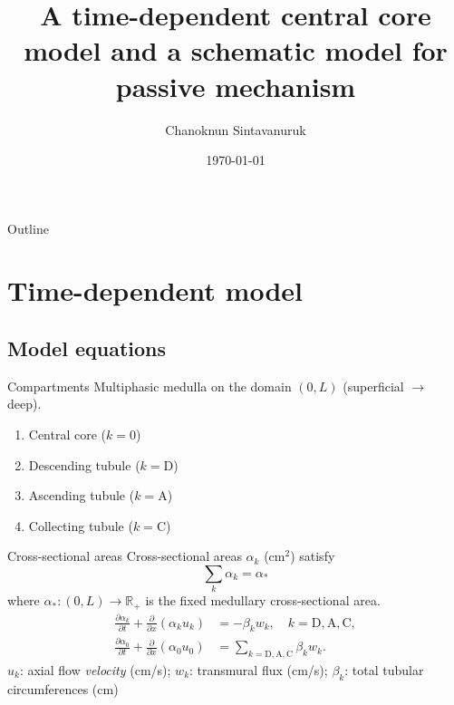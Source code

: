 \documentclass{beamer}
\title[]{A time-dependent central core model and a schematic model for passive mechanism}
\author[C. Sint]{Chanoknun Sintavanuruk 
}
\date{\today}
\begin{document}
\begin{frame}
    \titlepage 
\end{frame}

\begin{frame}{Outline}
    \tableofcontents
\end{frame}

\section{Time-dependent model}

\subsection{Model equations}

\begin{frame}{Compartments}
    Multiphasic medulla on the domain $(0,L)$ (superficial $\to$ deep).
    \begin{enumerate}
        \item Central core ($k=0$)
        \item Descending tubule ($k=\mathrm{D}$)
        \item Ascending tubule ($k=\mathrm{A}$)
        \item Collecting tubule ($k=\mathrm{C}$)
    \end{enumerate}
\end{frame}

\begin{frame}{Cross-sectional areas}
    Cross-sectional areas $\alpha_k$ ($\text{cm}^2$) satisfy
    \begin{equation}\label{eq:vol_conserv}
        \sum_k \alpha_k = \alpha_*
    \end{equation}
        where $\alpha_*:(0,L)\to \mathbb{R}_+$ is the fixed medullary cross-sectional area.
    \pause
    \begin{align}\label{eq:volume_dynamics}
        \frac{\partial \alpha_k}{\partial t} + \frac{\partial}{\partial x}\left( \alpha_k u_k \right) &= -\beta_kw_k,\quad k=\mathrm{D},\mathrm{A},\mathrm{C},\\
        \frac{\partial \alpha_0}{\partial t} + \frac{\partial }{\partial x}\left( \alpha_0 u_0 \right) &= \sum_{k=\mathrm{D},\mathrm{A},\mathrm{C}} \beta_kw_k.
    \end{align}
    $u_k$: axial flow \textit{velocity} (cm/s); $w_k$: transmural flux (cm/s); $\beta_k$: total tubular circumferences (cm)
\end{frame}
\end{document}
